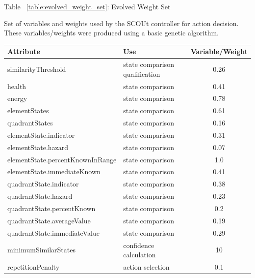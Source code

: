 
\begin{center}
  \label{table:evolved_weight_set}
  \caption{Table ~\ref{table:evolved_weight_set}: Evolved Weight Set}
  \caption{Set of variables and weights used by the SCOUt controller for action decision. These variables/weights were produced using a basic genetic algorithm.}
  \begin{tabular}{ l l c }
    \textbf{Attribute}                & \textbf{Use}                    & \textbf{Variable/Weight} \\
    \hline
    similarityThreshold               & state comparison qualification  & 0.26  \\
    health                            & state comparison                & 0.41  \\
    energy                            & state comparison                & 0.78  \\
    elementStates                     & state comparison                & 0.61  \\
    quadrantStates                    & state comparison                & 0.16  \\
    elementState.indicator            & state comparison                & 0.31  \\
    elementState.hazard               & state comparison                & 0.07  \\
    elementState.percentKnownInRange  & state comparison                & 1.0   \\
    elementState.immediateKnown       & state comparison                & 0.41  \\
    quadrantState.indicator           & state comparison                & 0.38  \\
    quadrantState.hazard              & state comparison                & 0.23  \\
    quadrantState.percentKnown        & state comparison                & 0.2   \\
    quadrantState.averageValue        & state comparison                & 0.19  \\
    quadrantState.immediateValue      & state comparison                & 0.29  \\
    minimumSimilarStates              & confidence calculation          & 10    \\
    repetitionPenalty                 & action selection                & 0.1   \\

\end{tabular}
\end{center}
